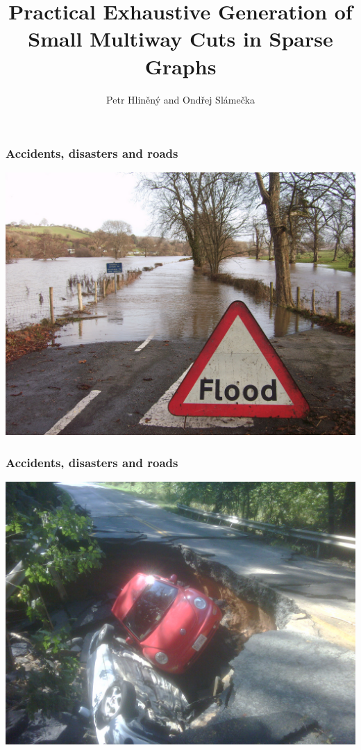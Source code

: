 \documentclass[10pt]{beamer}
\title{
Practical Exhaustive Generation of Small
Multiway Cuts in Sparse Graphs
}
\subtitle{}
\date{}
\author{Petr Hliněný and Ondřej Slámečka}
\institute{Faculty of Informatics, Masaryk University, Brno}
\begin{document}
\maketitle

\begin{frame}
	\frametitle{Accidents, disasters and roads}
	\includegraphics[width=\textwidth]{images/flood.jpg}
\end{frame}

\begin{frame}
	\frametitle{Accidents, disasters and roads}
	\includegraphics[width=\textwidth]{images/road_wash.jpg}
\end{frame}
\end{document}

